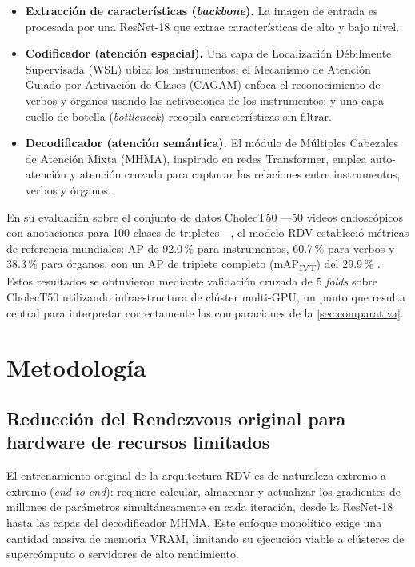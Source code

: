 \documentclass[11pt]{article}
\begin{document}
\begin{itemize}[leftmargin=1.4em]
    \item \textbf{Extracción de características (\emph{backbone}).} La imagen de entrada es procesada por una ResNet-18 que extrae características de alto y bajo nivel.
    \item \textbf{Codificador (atención espacial).} Una capa de Localización Débilmente Supervisada (WSL) ubica los instrumentos; el Mecanismo de Atención Guiado por Activación de Clases (CAGAM) enfoca el reconocimiento de verbos y órganos usando las activaciones de los instrumentos; y una capa cuello de botella (\emph{bottleneck}) recopila características sin filtrar.
    \item \textbf{Decodificador (atención semántica).} El módulo de Múltiples Cabezales de Atención Mixta (MHMA), inspirado en redes Transformer, emplea auto-atención y atención cruzada para capturar las relaciones entre instrumentos, verbos y órganos.
\end{itemize}

En su evaluación sobre el conjunto de datos CholecT50 —50 videos endoscópicos con anotaciones para 100 clases de tripletes—, el modelo RDV estableció métricas de referencia mundiales: AP de 92.0\,\% para instrumentos, 60.7\,\% para verbos y 38.3\,\% para órganos, con un AP de triplete completo (mAP\textsubscript{IVT}) del 29.9\,\% \cite{nwoye2022rendezvous}. Estos resultados se obtuvieron mediante validación cruzada de 5 \emph{folds} sobre CholecT50 utilizando infraestructura de clúster multi-GPU, un punto que resulta central para interpretar correctamente las comparaciones de la \cref{sec:comparativa}.

\section{Metodología}
\label{sec:metodologia}

\subsection{Reducción del Rendezvous original para hardware de recursos limitados}
\label{sec:reduccion}

El entrenamiento original de la arquitectura RDV es de naturaleza extremo a extremo (\emph{end-to-end}): requiere calcular, almacenar y actualizar los gradientes de millones de parámetros simultáneamente en cada iteración, desde la ResNet-18 hasta las capas del decodificador MHMA. Este enfoque monolítico exige una cantidad masiva de memoria VRAM, limitando su ejecución viable a clústeres de supercómputo o servidores de alto rendimiento.
\end{document}
